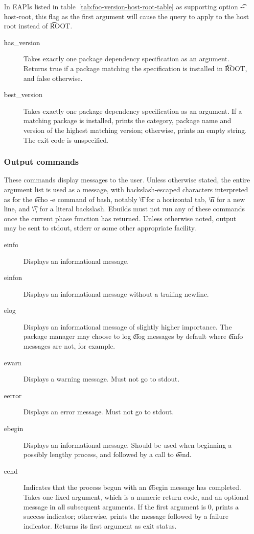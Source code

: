  In EAPIs listed in table~\ref{tab:foo-version-host-root-table} as
supporting option \t{-{}-host-root}, this flag as the first argument will cause the query to apply
to the host root instead of \t{ROOT}.
\begin{description}
\item[has\_version] Takes exactly one package dependency specification as an argument. Returns
    true if a package matching the specification is installed in \t{ROOT}, and false otherwise.
\item[best\_version] Takes exactly one package dependency specification as an argument. If a
    matching package is installed, prints the category, package name and version of the highest
    matching version; otherwise, prints an empty string. The exit code is unspecified.
\end{description}

\subsubsection{Output commands}
These commands display messages to the user. Unless otherwise stated, the entire argument list is
used as a message, with backslash-escaped characters interpreted as for the \t{echo -e} command of
bash, notably \t{\textbackslash t} for a horizontal tab, \t{\textbackslash n} for a new line, and
\t{\textbackslash\textbackslash} for a literal backslash. Ebuilds must not run any of these commands
once the current phase function has returned. Unless otherwise noted, output may be sent to stdout,
stderr or some other appropriate facility.
\begin{description}
\item[einfo] Displays an informational message.
\item[einfon] Displays an informational message without a trailing newline.
\item[elog] Displays an informational message of slightly higher importance. The package
    manager may choose to log \t{elog} messages by default where \t{einfo} messages are not, for
    example.
\item[ewarn] Displays a warning message. Must not go to stdout.
\item[eerror] Displays an error message. Must not go to stdout.
\item[ebegin] Displays an informational message. Should be used when beginning a possibly
    lengthy process, and followed by a call to \t{eend}.
\item[eend] Indicates that the process begun with an \t{ebegin} message has completed. Takes one
    fixed argument, which is a numeric return code, and an optional message in all subsequent
    arguments. If the first argument is 0, prints a success indicator; otherwise, prints the
    message followed by a failure indicator. Returns its first argument as exit status.
\end{description}


